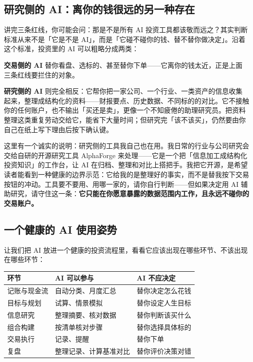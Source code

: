 \documentclass[a4paper,11pt,oneside,fontset=none,UTF8,zihao=-4]{ctexbook}
\begin{document}
\subsection{研究侧的
AI：离你的钱很远的另一种存在}\label{ux7814ux7a76ux4fa7ux7684-aiux79bbux4f60ux7684ux94b1ux5f88ux8fdcux7684ux53e6ux4e00ux79cdux5b58ux5728}

讲完三条红线，你可能会问：那是不是所有 AI
投资工具都该敬而远之？其实判断标准从来不是「它是不是
AI」，而是「它碰不碰你的钱、替不替你做决定」。沿着这个标准，投资里的 AI
可以粗略分成两类：

\textbf{交易侧的 AI}
替你看盘、选标的、甚至替你下单------它离你的钱太近，正是上面三条红线要拦住的对象。

\textbf{研究侧的 AI}
则完全相反：它帮你把一家公司、一个行业、一类资产的信息收集起来，整理成结构化的资料------财报要点、历史数据、不同标的的对比。它不接触你的任何账户，也不输出「买还是卖」，更像一个不知疲倦的助理研究员。把资料整理这类重复劳动交给它，能省下大量时间；但研究完「该不该买」，仍然要由你自己在纸上写下理由后按下确认键。

这里有一个诚实的说明：研究侧的工具我自己也在用。我日常的行业与公司研究会交给自研的开源研究工具
AlphaForge
来处理------它是一个把「信息加工成结构化投资知识」的工作台，让 AI
在归档、整理和对比上搭把手。我把它开源，是希望读者能看到一种健康的边界示范：它给我的是整理好的事实，而不是替我按下交易按钮的冲动。工具要不要用、用哪一家的，请你自行判断------但如果决定用
AI
辅助研究，请守住这一条：\textbf{它只能在你愿意暴露的数据范围内工作，且永远不碰你的交易账户。}

\subsection{一个健康的 AI
使用姿势}\label{ux4e00ux4e2aux5065ux5eb7ux7684-ai-ux4f7fux7528ux59ffux52bf}

让我们把 AI
放进一个健康的投资流程里，看看它应该出现在哪些环节、不该出现在哪些环节：

\begin{longtable}[]{@{}lll@{}}
\toprule\noalign{}\rowcolor{dh-pink!25}
环节 & AI 可以参与 & AI 不应决定 \\
\midrule\noalign{}
\endhead
\bottomrule\noalign{}
\endlastfoot
记账与现金流 & 自动分类、月度汇总 & 替你决定怎么花钱 \\
目标与规划 & 试算、情景模拟 & 替你设定人生目标 \\
信息研究 & 整理摘要、核对数据 & 替你判断该买什么 \\
组合构建 & 按清单核对步骤 & 替你选择具体标的 \\
交易执行 & 记录、提醒 & 替你下单 \\
复盘 & 整理记录、计算基准对比 & 替你评价决策对错 \\
\end{longtable}
\end{document}
